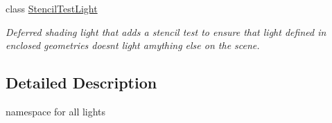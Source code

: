 \begin{DoxyCompactItemize}
class \mbox{\hyperlink{class_geometry_engine_1_1_geometry_world_item_1_1_geometry_light_1_1_stencil_test_light}{Stencil\+Test\+Light}}
\begin{DoxyCompactList}\small\item\em Deferred shading light that adds a stencil test to ensure that light defined in enclosed geometries doesn\textquotesingle{}t light amything else on the scene. \end{DoxyCompactList}\end{DoxyCompactItemize}


\subsection{Detailed Description}
namespace for all lights 